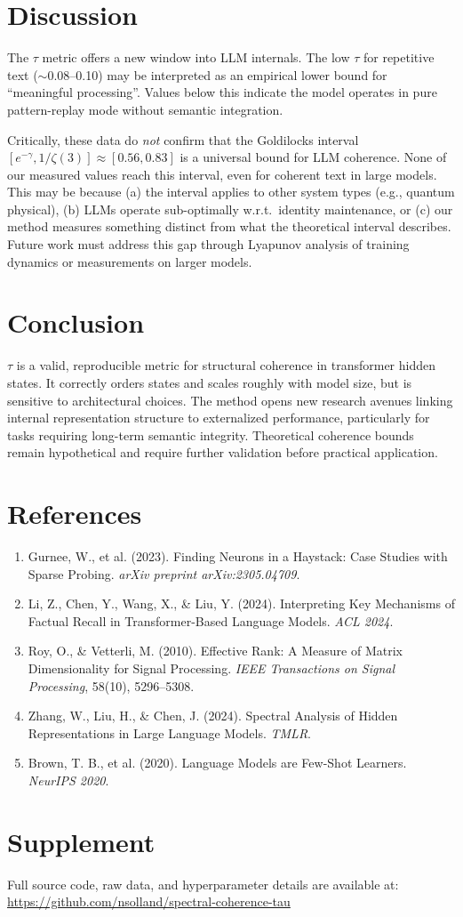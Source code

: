 \documentclass[10pt,a4paper]{article}
\begin{document}
\section{Discussion}
The $\tau$ metric offers a new window into LLM internals. The low $\tau$ for repetitive text ($\sim$0.08--0.10) may be interpreted as an empirical lower bound for ``meaningful processing''. Values below this indicate the model operates in pure pattern-replay mode without semantic integration.

Critically, these data do \textit{not} confirm that the Goldilocks interval $[e^{-\gamma}, 1/\zeta(3)] \approx [0.56, 0.83]$ is a universal bound for LLM coherence. None of our measured values reach this interval, even for coherent text in large models. This may be because (a) the interval applies to other system types (e.g., quantum physical), (b) LLMs operate sub-optimally w.r.t.\ identity maintenance, or (c) our method measures something distinct from what the theoretical interval describes. Future work must address this gap through Lyapunov analysis of training dynamics or measurements on larger models.

\section{Conclusion}
$\tau$ is a valid, reproducible metric for structural coherence in transformer hidden states. It correctly orders states and scales roughly with model size, but is sensitive to architectural choices. The method opens new research avenues linking internal representation structure to externalized performance, particularly for tasks requiring long-term semantic integrity. Theoretical coherence bounds remain hypothetical and require further validation before practical application.

\section*{References}
\begin{enumerate}
    \item Gurnee, W., et al. (2023). Finding Neurons in a Haystack: Case Studies with Sparse Probing. \textit{arXiv preprint arXiv:2305.04709}.
    \item Li, Z., Chen, Y., Wang, X., \& Liu, Y. (2024). Interpreting Key Mechanisms of Factual Recall in Transformer-Based Language Models. \textit{ACL 2024}.
    \item Roy, O., \& Vetterli, M. (2010). Effective Rank: A Measure of Matrix Dimensionality for Signal Processing. \textit{IEEE Transactions on Signal Processing}, 58(10), 5296--5308.
    \item Zhang, W., Liu, H., \& Chen, J. (2024). Spectral Analysis of Hidden Representations in Large Language Models. \textit{TMLR}.
    \item Brown, T. B., et al. (2020). Language Models are Few-Shot Learners. \textit{NeurIPS 2020}.
\end{enumerate}

\appendix
\section{Supplement}
Full source code, raw data, and hyperparameter details are available at: \url{https://github.com/nsolland/spectral-coherence-tau}
\end{document}
